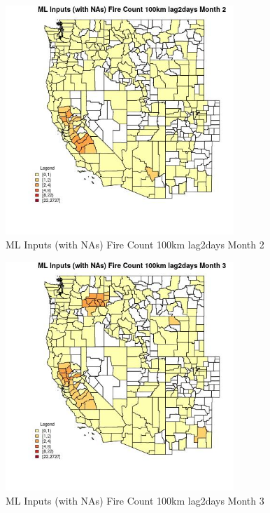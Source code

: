 \begin{figure} 
\centering  
\includegraphics[width=0.77\textwidth]{Code_Outputs/Report_ML_input_PM25_Step4_part_f_de_duplicated_aveswNAs_CountyFire_Count_100km_lag2daysmedianMonth2.jpg} 
\caption{\label{fig:Report_ML_input_PM25_Step4_part_f_de_duplicated_aveswNAsCountyFire_Count_100km_lag2daysmedianMonth2}ML Inputs (with NAs) Fire Count 100km lag2days Month 2} 
\end{figure} 
 

\begin{figure} 
\centering  
\includegraphics[width=0.77\textwidth]{Code_Outputs/Report_ML_input_PM25_Step4_part_f_de_duplicated_aveswNAs_CountyFire_Count_100km_lag2daysmedianMonth3.jpg} 
\caption{\label{fig:Report_ML_input_PM25_Step4_part_f_de_duplicated_aveswNAsCountyFire_Count_100km_lag2daysmedianMonth3}ML Inputs (with NAs) Fire Count 100km lag2days Month 3} 
\end{figure} 
 

